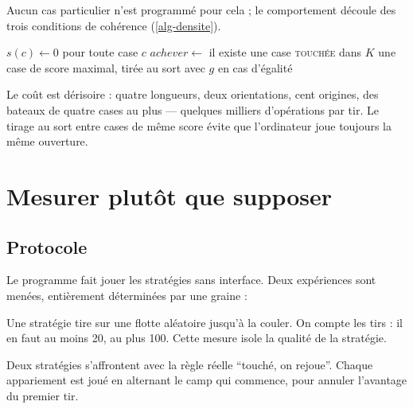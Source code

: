 Aucun cas particulier n'est programmé pour cela ; le comportement découle des trois
conditions de cohérence (\cref{alg-densite}).

\begin{algorithm}[ht]
    \caption{Choix d'une cible au niveau difficile}
    \label{alg-densite}
    $s(c) \gets 0$ pour toute case $c$\;
    $\mathit{achever} \gets$ il existe une case \textsc{touchée} dans $K$\;
    \Return une case de score maximal, tirée au sort avec $g$ en cas d'égalité\;
\end{algorithm}

Le coût est dérisoire : quatre longueurs, deux orientations, cent origines, des bateaux de
quatre cases au plus --- quelques milliers d'opérations par tir. Le tirage au sort entre
cases de même score évite que l'ordinateur joue toujours la même ouverture.

\section{Mesurer plutôt que supposer}

\subsection{Protocole}

Le programme  fait jouer les stratégies sans interface. Deux
expériences sont menées, entièrement déterminées par une graine :

\begin{description}[style=nextline, leftmargin=1.2em]
    \item[En solitaire] Une stratégie tire sur une flotte aléatoire jusqu'à la couler. On
          compte les tirs : il en faut au moins 20, au plus 100. Cette mesure isole la qualité de
          la stratégie.
    \item[En duel] Deux stratégies s'affrontent avec la règle réelle \enquote{touché, on
              rejoue}. Chaque appariement est joué en alternant le camp qui commence, pour annuler
          l'avantage du premier tir.
\end{description}

